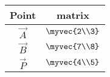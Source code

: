 \begin{tabular}{|c|c|}
	\hline
\textbf{Point} & \textbf{matrix} \\
\hline
$\vec{A}$ & $\myvec{2\\3}$ \\
\hline
$\vec{B}$ & $\myvec{7\\8}$ \\
\hline
$\vec{P}$ & $\myvec{4\\5}$ \\
\hline
\end{tabular}
